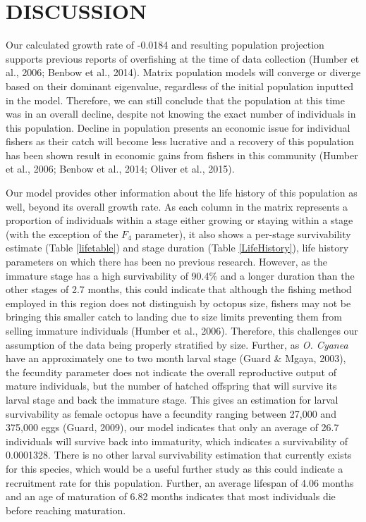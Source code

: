 \documentclass[
]{article}
\begin{document}
\hypertarget{discussion}{%
\section{DISCUSSION}\label{discussion}}

Our calculated growth rate of -0.0184 and resulting population projection supports previous reports of overfishing at the time of data collection (Humber et al., 2006; Benbow et al., 2014). Matrix population models will converge or diverge based on their dominant eigenvalue, regardless of the initial population inputted in the model. Therefore, we can still conclude that the population at this time was in an overall decline, despite not knowing the exact number of individuals in this population. Decline in population presents an economic issue for individual fishers as their catch will become less lucrative and a recovery of this population has been shown result in economic gains from fishers in this community (Humber et al., 2006; Benbow et al., 2014; Oliver et al., 2015).

Our model provides other information about the life history of this population as well, beyond its overall growth rate. As each column in the matrix represents a proportion of individuals within a stage either growing or staying within a stage (with the exception of the \(F_4\) parameter), it also shows a per-stage survivability estimate (Table \ref{lifetable}) and stage duration (Table \ref{LifeHistory}), life history parameters on which there has been no previous research. However, as the immature stage has a high survivability of 90.4\% and a longer duration than the other stages of 2.7 months, this could indicate that although the fishing method employed in this region does not distinguish by octopus size, fishers may not be bringing this smaller catch to landing due to size limits preventing them from selling immature individuals (Humber et al., 2006). Therefore, this challenges our assumption of the data being properly stratified by size. Further, as \emph{O. Cyanea} have an approximately one to two month larval stage (Guard \& Mgaya, 2003), the fecundity parameter does not indicate the overall reproductive output of mature individuals, but the number of hatched offspring that will survive its larval stage and back the immature stage. This gives an estimation for larval survivability as female octopus have a fecundity ranging between 27,000 and 375,000 eggs (Guard, 2009), our model indicates that only an average of 26.7 individuals will survive back into immaturity, which indicates a survivability of 0.0001328. There is no other larval survivability estimation that currently exists for this species, which would be a useful further study as this could indicate a recruitment rate for this population. Further, an average lifespan of 4.06 months and an age of maturation of 6.82 months indicates that most individuals die before reaching maturation.
\end{document}
